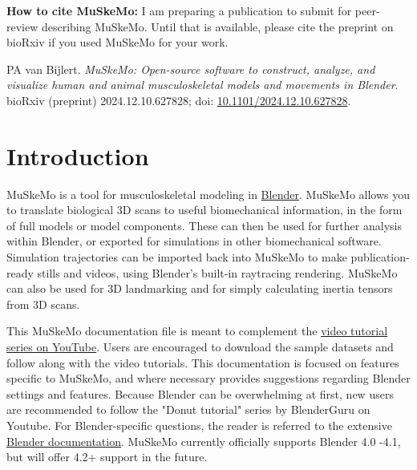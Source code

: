 \documentclass{article}
\begin{document}
\vspace{20pt} %
\noindent
\textbf{How to cite MuSkeMo:} I am preparing a publication to submit for peer-review describing MuSkeMo. Until that is available, please cite the preprint on bioRxiv if you used MuSkeMo for your work.

\noindent
PA van Bijlert. \textit{MuSkeMo: Open-source software to construct, analyze, and visualize human and animal musculoskeletal models and movements in Blender}. bioRxiv (preprint) 2024.12.10.627828; doi: \href{https://doi.org/10.1101/2024.12.10.627828}{10.1101/2024.12.10.627828}.

\vfill  %

\newpage  %


\tableofcontents

\newpage
\section{Introduction}

MuSkeMo is a tool for musculoskeletal modeling in \href{https://www.blender.org}{Blender}. MuSkeMo allows you to translate biological 3D scans to useful biomechanical information, in the form of full models or model components. These can then be used for further analysis within Blender, or exported for simulations in other biomechanical software. Simulation trajectories can be imported back into MuSkeMo to make publication-ready stills and videos, using Blender’s built-in raytracing rendering. MuSkeMo can also be used for 3D landmarking and for simply calculating inertia tensors from 3D scans.

This MuSkeMo documentation file is meant to complement the \href{https://youtube.com/playlist?list=PLfgxaucAWlEp5-cavvXmdrTIWYT_tgZYK&si=Cdl9MchuLP5aRJNL}{video tutorial series on YouTube}. Users are encouraged to download the sample datasets and follow along with the video tutorials.
This documentation is focused on features specific to MuSkeMo, and where necessary provides suggestions regarding Blender settings and features. Because Blender can be overwhelming at first, new users are recommended to follow the "Donut tutorial" series by BlenderGuru on Youtube. For Blender-specific questions, the reader is referred to the extensive \href{https://docs.blender.org/}{Blender documentation}. MuSkeMo currently officially supports Blender 4.0 -4.1, but will offer 4.2+ support in the future. 
\end{document}
